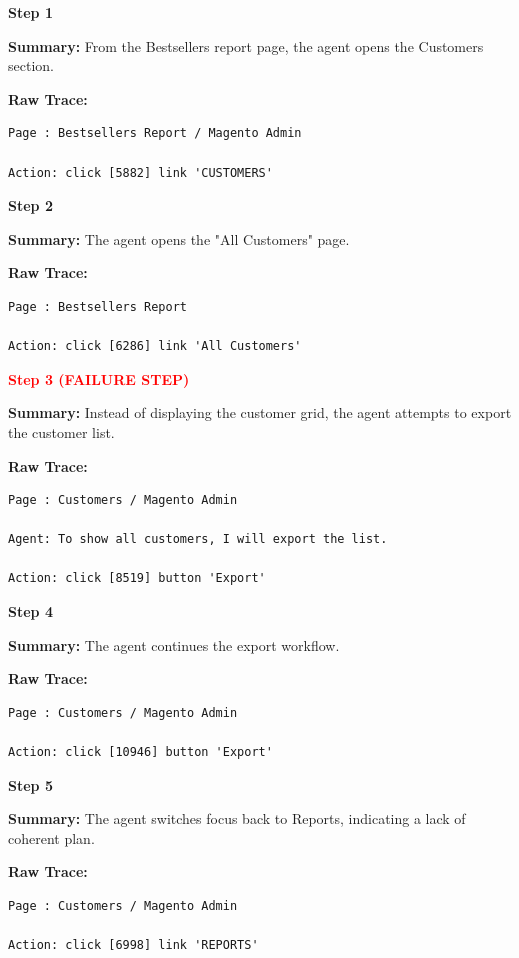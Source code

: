 \documentclass[11pt]{article}
\begin{document}
\begin{tcolorbox}[
breakable,
colback=customwhite,
colframe=custompurple,
title=Planning Error,
fontupper=\fontfamily{pcr}\selectfont\scriptsize
]

\textbf{Step 1}

\textbf{Summary:}  
From the Bestsellers report page, the agent opens the Customers section.

\textbf{Raw Trace:}
\begin{verbatim}
Page : Bestsellers Report / Magento Admin

Action: click [5882] link 'CUSTOMERS'
\end{verbatim}

\medskip
\textbf{Step 2}

\textbf{Summary:}  
The agent opens the "All Customers" page.

\textbf{Raw Trace:}
\begin{verbatim}
Page : Bestsellers Report

Action: click [6286] link 'All Customers'
\end{verbatim}

\medskip
\textbf{\textcolor{red}{Step 3 (FAILURE STEP)}}

\textbf{Summary:}  
Instead of displaying the customer grid, the agent attempts to export the customer list.

\textbf{Raw Trace:}
\begin{verbatim}
Page : Customers / Magento Admin

Agent: To show all customers, I will export the list.

Action: click [8519] button 'Export'
\end{verbatim}

\medskip
\textbf{Step 4}

\textbf{Summary:}  
The agent continues the export workflow.

\textbf{Raw Trace:}
\begin{verbatim}
Page : Customers / Magento Admin

Action: click [10946] button 'Export'
\end{verbatim}

\medskip
\textbf{Step 5}

\textbf{Summary:}  
The agent switches focus back to Reports, indicating a lack of coherent plan.

\textbf{Raw Trace:}
\begin{verbatim}
Page : Customers / Magento Admin

Action: click [6998] link 'REPORTS'
\end{verbatim}

\end{tcolorbox}
\end{document}
